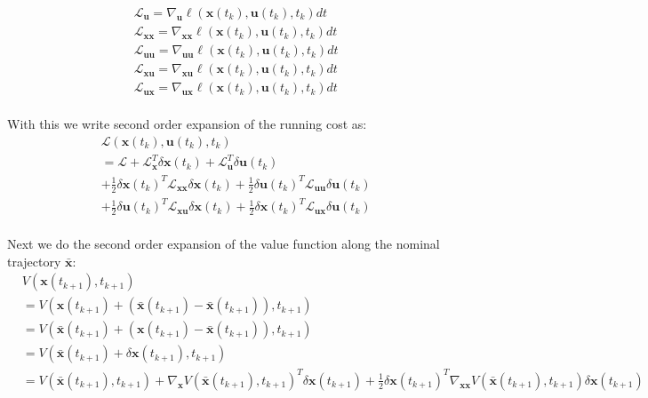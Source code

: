 \documentclass[11pt]{homework}
\renewcommand{\vec}[1]{\ensuremath{\boldsymbol{#1}}}
\begin{document}
\begin{arabicparts}
\begin{align*}
				& \mathcal{L}_{\vec{u}} = \nabla_{\vec{u}}\ell(\vec{x}(t_{k}), \vec{u}(t_{k}), t_{k})dt \\
				& \mathcal{L}_{\vec{xx}} = \nabla_{\vec{xx}}\ell(\vec{x}(t_{k}), \vec{u}(t_{k}), t_{k})dt \\
				& \mathcal{L}_{\vec{uu}} = \nabla_{\vec{uu}}\ell(\vec{x}(t_{k}), \vec{u}(t_{k}), t_{k})dt \\
				& \mathcal{L}_{\vec{xu}} = \nabla_{\vec{xu}}\ell(\vec{x}(t_{k}), \vec{u}(t_{k}), t_{k})dt \\
				& \mathcal{L}_{\vec{ux}} = \nabla_{\vec{ux}}\ell(\vec{x}(t_{k}), \vec{u}(t_{k}), t_{k})dt \\
			\end{align*}
		
		With this we write second order expansion of the running cost as: 
			\begin{align*}
				& \mathcal{L}(\vec{x}(t_{k}), \vec{u}(t_{k}), t_{k}) \\
				& = \mathcal{L} + \mathcal{L}_{\vec{x}}^{T}\delta\vec{x}(t_{k}) + \mathcal{L}_{\vec{u}}^{T}\delta\vec{u}(t_{k}) \\
				& + \frac{1}{2}\delta\vec{x}(t_{k})^{T}\mathcal{L}_{\vec{xx}}\delta\vec{x}(t_{k}) + \frac{1}{2}\delta\vec{u}(t_{k})^{T}\mathcal{L}_{\vec{uu}}\delta\vec{u}(t_{k}) \\
				& + \frac{1}{2}\delta\vec{u}(t_{k})^{T}\mathcal{L}_{\vec{xu}}\delta\vec{x}(t_{k}) + \frac{1}{2}\delta\vec{x}(t_{k})^{T}\mathcal{L}_{\vec{ux}}\delta\vec{u}(t_{k}) \\
			\end{align*} 

		Next we do the second order expansion of the value function along the nominal trajectory $\bar{\vec{x}}$: 
			\begin{align*}
				& V(\vec{x}(t_{k+1}), t_{k+1}) \\
				& = V(\vec{x}(t_{k+1}) + \left(\bar{\vec{x}}(t_{k+1}) - \bar{\vec{x}}(t_{k+1})\right), t_{k+1}) \\
				& = V(\bar{\vec{x}}(t_{k+1}) + \left(\vec{x}(t_{k+1}) - \bar{\vec{x}}(t_{k+1})\right), t_{k+1}) \\
				& = V(\bar{\vec{x}}(t_{k+1}) + \delta\vec{x}(t_{k+1}), t_{k+1}) \\
				& = V(\bar{\vec{x}}(t_{k+1}), t_{k+1}) + \nabla_{\vec{x}}V(\bar{\vec{x}}(t_{k+1}), t_{k+1})^{T}\delta\vec{x}(t_{k+1}) + \frac{1}{2}\delta\vec{x}(t_{k+1})^T\nabla_{\vec{xx}}V(\bar{\vec{x}}(t_{k+1}), t_{k+1})\delta\vec{x}(t_{k+1}) 
			\end{align*}
			

\end{arabicparts}
\end{document}
